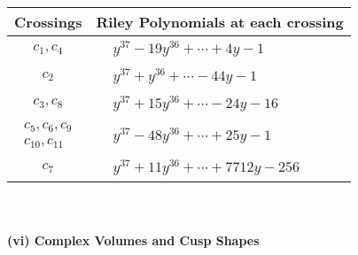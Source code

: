 \documentclass[1p]{elsarticle_modified}
\theoremstyle{definition}
\begin{document}
\begin{tabular}{m{50pt}|m{274pt}}
Crossings & \hspace{64pt}Riley Polynomials at each crossing \\
\hline $$\begin{aligned}c_{1},c_{4}\end{aligned}$$&$\begin{aligned}
&y^{37}-19 y^{36}+\cdots+4 y-1
\end{aligned}$\\
\hline $$\begin{aligned}c_{2}\end{aligned}$$&$\begin{aligned}
&y^{37}+y^{36}+\cdots-44 y-1
\end{aligned}$\\
\hline $$\begin{aligned}c_{3},c_{8}\end{aligned}$$&$\begin{aligned}
&y^{37}+15 y^{36}+\cdots-24 y-16
\end{aligned}$\\
\hline $$\begin{aligned}c_{5},c_{6},c_{9}\\c_{10},c_{11}\end{aligned}$$&$\begin{aligned}
&y^{37}-48 y^{36}+\cdots+25 y-1
\end{aligned}$\\
\hline $$\begin{aligned}c_{7}\end{aligned}$$&$\begin{aligned}
&y^{37}+11 y^{36}+\cdots+7712 y-256
\end{aligned}$\\
\hline
\end{tabular}\\~\\
\newpage\flushleft \textbf{(vi) Complex Volumes and Cusp Shapes}
\end{document}
